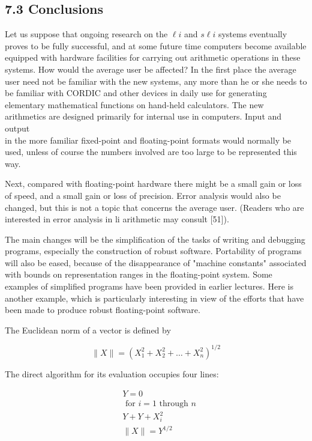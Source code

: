\documentclass[10pt]{article}
\begin{document}
\subsection*{7.3 Conclusions}
Let us suppose that ongoing research on the $\ell i$ and $s \ell i$ systems eventually proves to be fully successful, and at some future time computers become available equipped with hardware facilities for carrying out arithmetic operations in these systems. How would the average user be affected? In the first place the average user need not be familiar with the new systems, any more than he or she needs to be familiar with CORDIC and other devices in daily use for generating elementary mathematical functions on hand-held calculators. The new arithmetics are designed primarily for internal use in computers. Input and output\\
in the more familiar fixed-point and floating-point formats would normally be used, unless of course the numbers involved are too large to be represented this way.

Next, compared with floating-point hardware there might be a small gain or loss of speed, and a small gain or loss of precision. Error analysis would also be changed, but this is not a topic that concerns the average user. (Readers who are interested in error analysis in li arithmetic may consult [51]).

The main changes will be the simplification of the tasks of writing and debugging programs, especially the construction of robust software. Portability of programs will also be eased, because of the disappearance of "machine constants" associated with bounds on representation ranges in the floating-point system. Some examples of simplified programs have been provided in earlier lectures. Here is another example, which is particularly interesting in view of the efforts that have been made to produce robust floating-point software.

The Euclidean norm of a vector is defined by

$$
\|X\|=\left(X_{1}^{2}+X_{2}^{2}+\ldots+X_{n}^{2}\right)^{1 / 2}
$$

The direct algorithm for its evaluation occupies four lines:

$$
\begin{aligned}
& Y=0 \\
& \text { for } i=1 \text { through } n \\
& Y+Y+X_{i}^{2} \\
& \|X\|=Y^{1 / 2}
\end{aligned}
$$
\end{document}
